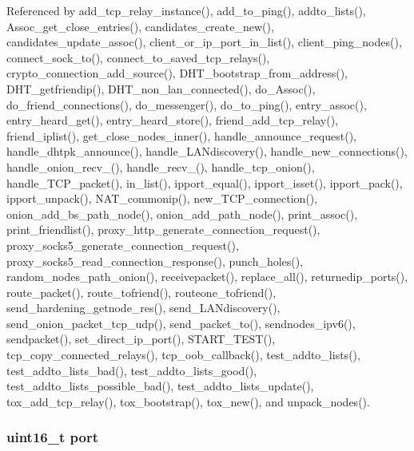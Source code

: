 Referenced by add\+\_\+tcp\+\_\+relay\+\_\+instance(), add\+\_\+to\+\_\+ping(), addto\+\_\+lists(), Assoc\+\_\+get\+\_\+close\+\_\+entries(), candidates\+\_\+create\+\_\+new(), candidates\+\_\+update\+\_\+assoc(), client\+\_\+or\+\_\+ip\+\_\+port\+\_\+in\+\_\+list(), client\+\_\+ping\+\_\+nodes(), connect\+\_\+sock\+\_\+to(), connect\+\_\+to\+\_\+saved\+\_\+tcp\+\_\+relays(), crypto\+\_\+connection\+\_\+add\+\_\+source(), D\+H\+T\+\_\+bootstrap\+\_\+from\+\_\+address(), D\+H\+T\+\_\+getfriendip(), D\+H\+T\+\_\+non\+\_\+lan\+\_\+connected(), do\+\_\+\+Assoc(), do\+\_\+friend\+\_\+connections(), do\+\_\+messenger(), do\+\_\+to\+\_\+ping(), entry\+\_\+assoc(), entry\+\_\+heard\+\_\+get(), entry\+\_\+heard\+\_\+store(), friend\+\_\+add\+\_\+tcp\+\_\+relay(), friend\+\_\+iplist(), get\+\_\+close\+\_\+nodes\+\_\+inner(), handle\+\_\+announce\+\_\+request(), handle\+\_\+dhtpk\+\_\+announce(), handle\+\_\+\+L\+A\+Ndiscovery(), handle\+\_\+new\+\_\+connections(), handle\+\_\+onion\+\_\+recv\+\_(), handle\+\_\+recv\+\_(), handle\+\_\+tcp\+\_\+onion(), handle\+\_\+\+T\+C\+P\+\_\+packet(), in\+\_\+list(), ipport\+\_\+equal(), ipport\+\_\+isset(), ipport\+\_\+pack(), ipport\+\_\+unpack(), N\+A\+T\+\_\+commonip(), new\+\_\+\+T\+C\+P\+\_\+connection(), onion\+\_\+add\+\_\+bs\+\_\+path\+\_\+node(), onion\+\_\+add\+\_\+path\+\_\+node(), print\+\_\+assoc(), print\+\_\+friendlist(), proxy\+\_\+http\+\_\+generate\+\_\+connection\+\_\+request(), proxy\+\_\+socks5\+\_\+generate\+\_\+connection\+\_\+request(), proxy\+\_\+socks5\+\_\+read\+\_\+connection\+\_\+response(), punch\+\_\+holes(), random\+\_\+nodes\+\_\+path\+\_\+onion(), receivepacket(), replace\+\_\+all(), returnedip\+\_\+ports(), route\+\_\+packet(), route\+\_\+tofriend(), routeone\+\_\+tofriend(), send\+\_\+hardening\+\_\+getnode\+\_\+res(), send\+\_\+\+L\+A\+Ndiscovery(), send\+\_\+onion\+\_\+packet\+\_\+tcp\+\_\+udp(), send\+\_\+packet\+\_\+to(), sendnodes\+\_\+ipv6(), sendpacket(), set\+\_\+direct\+\_\+ip\+\_\+port(), S\+T\+A\+R\+T\+\_\+\+T\+E\+S\+T(), tcp\+\_\+copy\+\_\+connected\+\_\+relays(), tcp\+\_\+oob\+\_\+callback(), test\+\_\+addto\+\_\+lists(), test\+\_\+addto\+\_\+lists\+\_\+bad(), test\+\_\+addto\+\_\+lists\+\_\+good(), test\+\_\+addto\+\_\+lists\+\_\+possible\+\_\+bad(), test\+\_\+addto\+\_\+lists\+\_\+update(), tox\+\_\+add\+\_\+tcp\+\_\+relay(), tox\+\_\+bootstrap(), tox\+\_\+new(), and unpack\+\_\+nodes().

\hypertarget{struct_i_p___port_a8e0798404bf2cf5dabb84c5ba9a4f236}{
\subsubsection[{port}]{\setlength{\rightskip}{0pt plus 5cm}uint16\+\_\+t port}}\label{struct_i_p___port_a8e0798404bf2cf5dabb84c5ba9a4f236}


